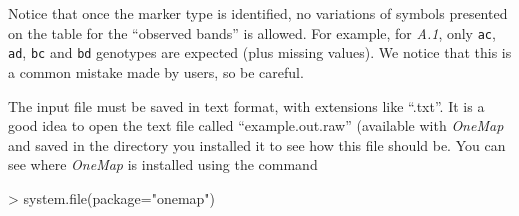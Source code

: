 \documentclass[letterpaper,12pt,oneside]{article}
\begin{document}
Notice that once the marker type is identified, no variations of symbols presented on the table for the ``observed bands'' is allowed. For example, for {\sl A.1}, only {\tt ac}, {\tt ad}, {\tt bc} and {\tt bd} genotypes are expected (plus missing values). We notice that this is a common mistake made by users, so be careful. 

The input file must be saved in text format, with extensions like ``.txt''. It is a good idea to open the text file called ``example.out.raw'' (available with {\sl OneMap} and saved in the directory you installed it to see how this file should be. You can see where {\sl OneMap} is installed using the command 

\begin{Schunk}
\begin{Sinput}
> system.file(package="onemap")
\end{Sinput}
\end{Schunk}
\end{document}
